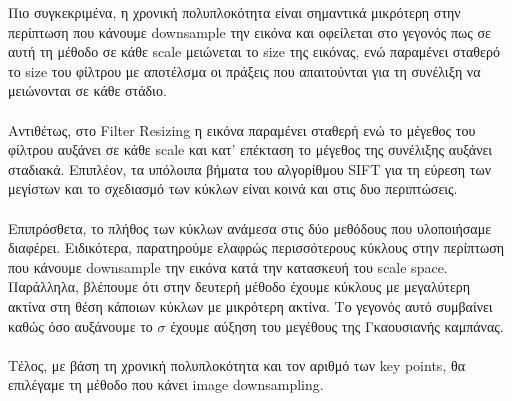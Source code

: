 \documentclass{article}
\newcommand{\tl}[1]{\textlatin{#1}}
\begin{document}
	\noindent
	Πιο συγκεκριμένα, η χρονική πολυπλοκότητα είναι σημαντικά μικρότερη στην περίπτωση που κάνουμε \tl{downsample} την εικόνα και οφείλεται στο γεγονός πως 
	σε αυτή τη μέθοδο σε κάθε \tl{scale} μειώνεται το \tl{size} της εικόνας, ενώ παραμένει σταθερό το \tl{size} του φίλτρου με αποτέλσμα οι πράξεις που απαιτούνται 
	για τη συνέλιξη να μειώνονται σε κάθε στάδιο.\\\\
	\noindent
	Αντιθέτως, στο \tl{Filter Resizing} η εικόνα παραμένει σταθερή ενώ το μέγεθος του φίλτρου αυξάνει σε κάθε \tl{scale} και κατ' επέκταση το μέγεθος της
	συνέλιξης αυξάνει σταδιακά. Επιπλέον, τα υπόλοιπα βήματα του αλγορίθμου \tl{SIFT} για τη εύρεση των μεγίστων και το σχεδιασμό των κύκλων είναι κοινά και στις δυο περιπτώσεις.\\\\
	\noindent
	Επιπρόσθετα, το πλήθος των κύκλων ανάμεσα στις δύο μεθόδους που υλοποιήσαμε διαφέρει. Ειδικότερα, παρατηρούμε ελαφρώς περισσότερους κύκλους στην περίπτωση που 
	κάνουμε \tl{downsample} την εικόνα κατά την κατασκευή του \tl{scale space}. Παράλληλα, βλέπουμε ότι στην δευτερή μέθοδο έχουμε κύκλους με μεγαλύτερη ακτίνα στη 
	θέση κάποιων κύκλων με μικρότερη ακτίνα. Το γεγονός αυτό συμβαίνει καθώς όσο αυξάνουμε το $\sigma $ έχουμε αύξηση του μεγέθους της Γκαουσιανής καμπάνας. \\\\
	\noindent
	Τέλος, με βάση τη χρονική πολυπλοκότητα και τον αριθμό των \tl{key points}, θα επιλέγαμε τη μέθοδο που κάνει \tl{image downsampling}.
\end{document}
